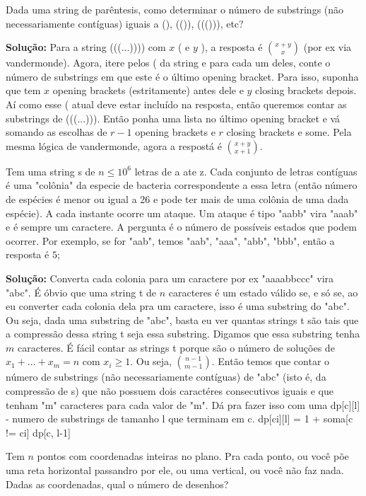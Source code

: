  Dada uma string de parêntesis, como determinar o número de substrings (não necessariamente contíguas) iguais a (), (()), ((())), etc?

\textbf{Solução:} Para a string (((...)))) com $x$ ( e $y$ ), a resposta é ${x+y \choose x}$ (por ex via vandermonde). Agora, itere pelos ( da string e para cada um deles, conte o número de substrings em que este é o último opening bracket. Para isso, suponha que tem $x$ opening brackets (estritamente) antes dele e $y$ closing brackets depois. Aí como esse ( atual deve estar incluído na resposta, então queremos contar as substrings de (((...))). Então ponha uma lista no último opening bracket e vá somando as escolhas de $r-1$ opening brackets e $r$ closing brackets e some. Pela mesma lógica de vandermonde, agora a respostá é ${x+y \choose x+1}$.

 Tem uma string s de $n \leq 10^6$ letras de a ate z. Cada conjunto de letras contíguas é uma "colônia" da especie de bacteria correspondente a essa letra (então número de espécies é menor ou igual a 26 e pode ter mais de uma colônia de uma dada espécie). A cada instante ocorre um ataque. Um ataque é tipo "aabb" vira "aaab" e é sempre um caractere. A pergunta é o número de possíveis estados que podem ocorrer. Por exemplo, se for "aab", temos "aab", "aaa", "abb", "bbb", então a resposta é $5$;

\textbf{Solução:} Converta cada colonia para um caractere por ex "aaaabbccc" vira "abc". É óbvio que uma string t de $n$ caracteres é um estado válido se, e só se, ao eu converter cada colonia dela pra um caractere, isso é uma substring do "abc". Ou seja, dada uma substring de "abc", basta eu ver quantas strings t são tais que a compressão dessa string t seja essa substring. Digamos que essa substring tenha $m$ caracteres. É fácil contar as strings t porque são o número de soluções de $x_1 + \dots + x_m = n$ com $x_i \geq 1$. Ou seja, ${n - 1 \choose m-1}$. Então temos que contar o número de substrings (não necessariamente contíguas) de "abc" (isto é, da compressão de s) que não possuem dois caractéres consecutivos iguais e que tenham "m" caracteres para cada valor de "m". Dá pra fazer isso com uma dp[c][l] - numero de substrings de tamanho l que terminam em c. dp[ci][l] = 1 + soma[c != ci] dp[c, l-1]

 Tem $n$ pontos com coordenadas inteiras no plano. Pra cada ponto, ou você põe uma reta horizontal passandro por ele, ou uma vertical, ou você não faz nada. Dadas as coordenadas, qual o número de desenhos?

